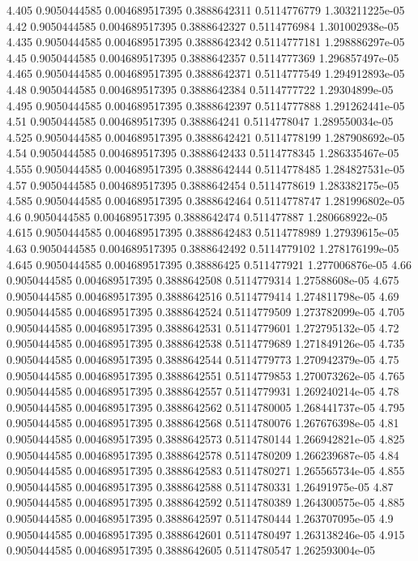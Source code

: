 {4.405 0.9050444585 0.004689517395 0.3888642311 0.5114776779 1.303211225e-05
4.42 0.9050444585 0.004689517395 0.3888642327 0.5114776984 1.301002938e-05
4.435 0.9050444585 0.004689517395 0.3888642342 0.5114777181 1.298886297e-05
4.45 0.9050444585 0.004689517395 0.3888642357 0.5114777369 1.296857497e-05
4.465 0.9050444585 0.004689517395 0.3888642371 0.5114777549 1.294912893e-05
4.48 0.9050444585 0.004689517395 0.3888642384 0.5114777722 1.29304899e-05
4.495 0.9050444585 0.004689517395 0.3888642397 0.5114777888 1.291262441e-05
4.51 0.9050444585 0.004689517395 0.388864241 0.5114778047 1.289550034e-05
4.525 0.9050444585 0.004689517395 0.3888642421 0.5114778199 1.287908692e-05
4.54 0.9050444585 0.004689517395 0.3888642433 0.5114778345 1.286335467e-05
4.555 0.9050444585 0.004689517395 0.3888642444 0.5114778485 1.284827531e-05
4.57 0.9050444585 0.004689517395 0.3888642454 0.5114778619 1.283382175e-05
4.585 0.9050444585 0.004689517395 0.3888642464 0.5114778747 1.281996802e-05
4.6 0.9050444585 0.004689517395 0.3888642474 0.511477887 1.280668922e-05
4.615 0.9050444585 0.004689517395 0.3888642483 0.5114778989 1.27939615e-05
4.63 0.9050444585 0.004689517395 0.3888642492 0.5114779102 1.278176199e-05
4.645 0.9050444585 0.004689517395 0.38886425 0.511477921 1.277006876e-05
4.66 0.9050444585 0.004689517395 0.3888642508 0.5114779314 1.27588608e-05
4.675 0.9050444585 0.004689517395 0.3888642516 0.5114779414 1.274811798e-05
4.69 0.9050444585 0.004689517395 0.3888642524 0.5114779509 1.273782099e-05
4.705 0.9050444585 0.004689517395 0.3888642531 0.5114779601 1.272795132e-05
4.72 0.9050444585 0.004689517395 0.3888642538 0.5114779689 1.271849126e-05
4.735 0.9050444585 0.004689517395 0.3888642544 0.5114779773 1.270942379e-05
4.75 0.9050444585 0.004689517395 0.3888642551 0.5114779853 1.270073262e-05
4.765 0.9050444585 0.004689517395 0.3888642557 0.5114779931 1.269240214e-05
4.78 0.9050444585 0.004689517395 0.3888642562 0.5114780005 1.268441737e-05
4.795 0.9050444585 0.004689517395 0.3888642568 0.5114780076 1.267676398e-05
4.81 0.9050444585 0.004689517395 0.3888642573 0.5114780144 1.266942821e-05
4.825 0.9050444585 0.004689517395 0.3888642578 0.5114780209 1.266239687e-05
4.84 0.9050444585 0.004689517395 0.3888642583 0.5114780271 1.265565734e-05
4.855 0.9050444585 0.004689517395 0.3888642588 0.5114780331 1.26491975e-05
4.87 0.9050444585 0.004689517395 0.3888642592 0.5114780389 1.264300575e-05
4.885 0.9050444585 0.004689517395 0.3888642597 0.5114780444 1.263707095e-05
4.9 0.9050444585 0.004689517395 0.3888642601 0.5114780497 1.263138246e-05
4.915 0.9050444585 0.004689517395 0.3888642605 0.5114780547 1.262593004e-05
}
